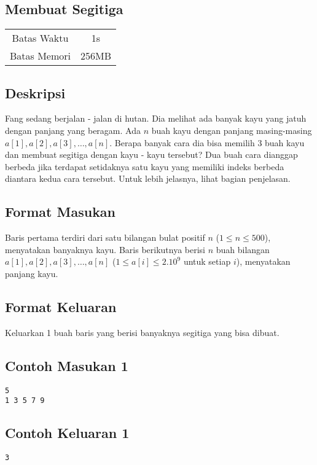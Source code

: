 \documentclass{article}
\begin{document}
\begin{center}
    \section*{Membuat Segitiga}

    \begin{tabular}{ | c c | }
        \hline
        Batas Waktu  & 1s \\    %
        Batas Memori & 256MB \\  %
        \hline
    \end{tabular}
\end{center}

\subsection*{Deskripsi}

Fang sedang berjalan - jalan di hutan. Dia melihat ada banyak kayu yang jatuh dengan panjang yang beragam. Ada $n$ buah kayu dengan panjang masing-masing $a[1], a[2], a[3], \dots, a[n]$. Berapa banyak cara dia bisa memilih 3 buah kayu dan membuat segitiga dengan kayu - kayu tersebut? Dua buah cara dianggap berbeda jika terdapat setidaknya satu kayu yang memiliki indeks berbeda diantara kedua cara tersebut. Untuk lebih jelasnya, lihat bagian penjelasan.

\subsection*{Format Masukan}

Baris pertama terdiri dari satu bilangan bulat positif $n$ ($1 \leq n \leq 500$), menyatakan banyaknya kayu.
Baris berikutnya berisi $n$ buah bilangan $a[1], a[2], a[3], \dots, a[n]$ ($1 \leq a[i] \leq 2.10^9$ untuk setiap $i$), menyatakan panjang kayu.

\subsection*{Format Keluaran}

Keluarkan 1 buah baris yang berisi banyaknya segitiga yang bisa dibuat.
\\

\begin{multicols}{2}
\subsection*{Contoh Masukan 1}
\begin{lstlisting}
5
1 3 5 7 9
\end{lstlisting}
\columnbreak
\subsection*{Contoh Keluaran 1}
\begin{lstlisting}
3
\end{lstlisting}
\vfill
\null
\end{multicols}
\end{document}

